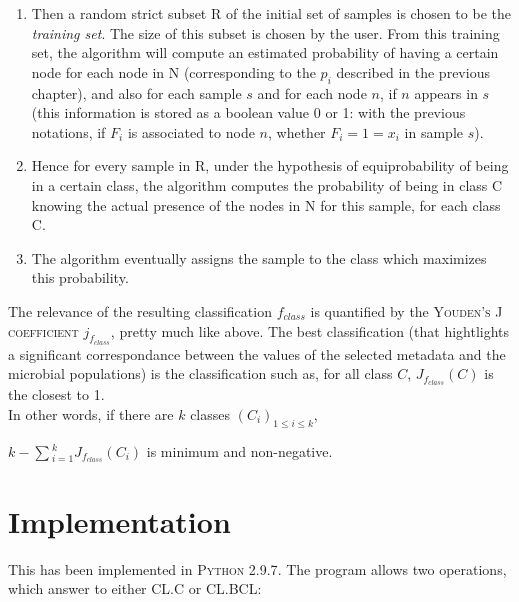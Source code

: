 \documentclass{report}
\begin{document}
\begin{enumerate}
\item Then a random strict subset \textsc{R} of the initial set of samples is chosen to be the \emph{training set}. The size of this subset is chosen by the user. From this training set, the algorithm will compute an estimated probability of having a certain node for each node in \textsc{N} (corresponding to the $p_{i}$ described in the previous chapter), and also for each sample $s$ and for each node $n$, if $n$ appears in $s$ (this information is stored as a boolean value 0 or 1: with the previous notations, if $F_{i}$ is associated to node $n$, whether $F_{i} = 1 = x_{i}$ in sample $s$).

\item Hence for every sample in \textsc{R}, under the hypothesis of equiprobability of being in a certain class, the algorithm computes the probability of being in class \textsc{C} knowing the actual presence of the nodes in \textsc{N} for this sample, for each class \textsc{C}. 

\item The algorithm eventually assigns the sample to the class which maximizes this probability.

\end{enumerate}

The relevance of the resulting classification $f_{class}$ is quantified by the \textsc{Youden's J coefficient} $j_{f_{class}}$, pretty much like above. The best classification (that hightlights a significant correspondance between the values of the selected metadata and the microbial populations) is the classification such as, for all class $C$, $J_{f_{class}}(C)$ is the closest to 1.\\

In other words, if there are $k$ classes $(C_{i})_{1 \le i \le k}$,\\

\begin{center}
$k - \sum{_{i = 1}^{k}}{J_{f_{class}}(C_{i})}$ is minimum and non-negative.
\end{center}

\section{Implementation}

This has been implemented in \textsc{Python 2.9.7}. The program allows two operations, which answer to either \textsc{CL.C} or \textsc{CL.BCL}:\\
\end{document}
